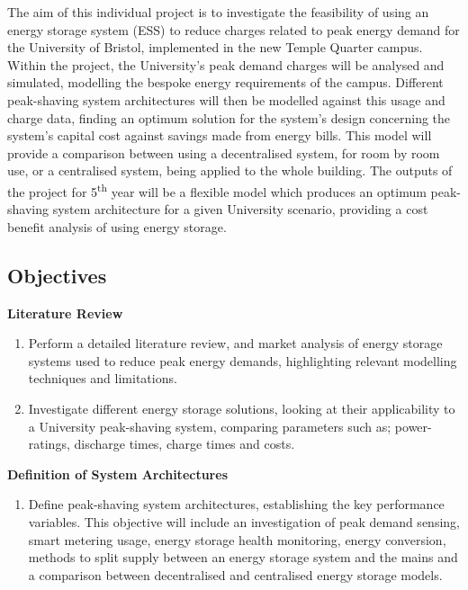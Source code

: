 The aim of this individual project is to investigate the feasibility of
using an energy storage system (ESS) to reduce charges related to peak
energy demand for the University of Bristol, implemented in the new
Temple Quarter campus. Within the project, the University's peak demand
charges will be analysed and simulated, modelling the bespoke energy
requirements of the campus. Different peak-shaving system architectures
will then be modelled against this usage and charge data, finding an
optimum solution for the system's design concerning the system's capital
cost against savings made from energy bills. This model will provide a
comparison between using a decentralised system, for room by room use,
or a centralised system, being applied to the whole building. The
outputs of the project for 5\textsuperscript{th} year will be a flexible
model which produces an optimum peak-shaving system architecture for a
given University scenario, providing a cost benefit analysis of using
energy storage.

\subsection{Objectives}\label{objectives}

\textbf{Literature Review}

\begin{enumerate}
\item Perform a detailed literature review, and market analysis of energy storage systems used to reduce peak energy demands, highlighting relevant modelling techniques and limitations.
\item Investigate different energy storage solutions, looking at their applicability to a University peak-shaving system, comparing parameters such as; power-ratings, discharge times, charge times and costs.
\end{enumerate}

\textbf{Definition of System Architectures}

\begin{enumerate}[resume]
\item Define peak-shaving system architectures, establishing the key performance variables. This objective will include an investigation of peak demand sensing, smart metering usage, energy storage health monitoring, energy conversion, methods to split supply between an energy storage system and the mains and a comparison between decentralised and centralised energy storage models.

\end{enumerate}

